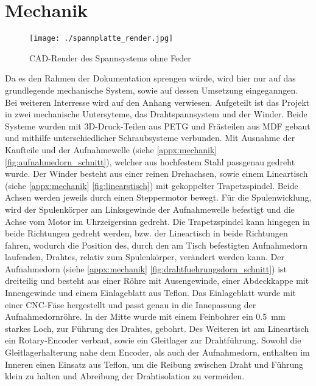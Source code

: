 \section{Mechanik}
\label{sec:Mechanik}




\begin{wrapfigure}{L}{0.3\textwidth}
    \centering
    \texttt{[image: ./spannplatte\_render.jpg]}
    \caption{CAD-Render des Spannsystems ohne Feder}
\end{wrapfigure}
Da es den Rahmen der Dokumentation sprengen würde, wird hier nur auf das grundlegende mechanische System, sowie auf dessen Umsetzung eingeganngen. Bei weiteren Interresse wird auf den Anhang verwiesen. Aufgeteilt ist das Projekt in zwei mechanische Untersyteme, das Drahtspannsystem und der Winder.\newline
Beide Systeme wurden mit 3D-Druck-Teilen aus PETG und Frästeilen aus MDF gebaut und mithilfe unterschiedlicher Schraubsysteme verbunden. Mit Ausnahme der Kaufteile und der Aufnahmewelle (siehe \autoref{appx:mechanik} \autoref{fig:aufnahmedorn_schnitt}), welcher aus hochfestem Stahl passgenau gedreht wurde.
\newline
Der Winder besteht aus einer reinen Drehachsen, sowie einem Lineartisch (siehe \autoref{appx:mechanik} \autoref{fig:linearstisch}) mit gekoppelter Trapetzspindel. Beide Achsen werden jeweils durch einen Steppermotor bewegt. Für die Spulenwicklung, wird der Spulenkörper am Linksgewinde der Aufnahmewelle befestigt und die Achse vom Motor im Uhrzeigersinn gedreht. Die Trapetzspindel kann hingegen in beide Richtungen gedreht werden, bzw. der Lineartisch in beide Richtungen fahren, wodurch die Position des, durch den am Tisch befestigten Aufnahmedorn laufenden, Drahtes, relativ zum Spulenkörper, verändert werden kann. Der Aufnahmedorn (siehe \autoref{appx:mechanik} \autoref{fig:drahtfuehrungsdorn_schnitt}) ist dreiteilig und besteht aus einer Röhre mit Ausengewinde, einer Abdeckkappe mit Innengewinde und einem Einlageblatt aus Teflon. Das Einlageblatt wurde mit einer CNC-Fäse hergestellt und passt genau in die Innepassung der Aufnahmedornröhre. In der Mitte wurde mit einem Feinbohrer ein 0.5~\si{\milli\metre} starkes Loch, zur Führung des Drahtes, gebohrt.
Des Weiteren ist am Lineartisch ein Rotary-Encoder verbaut, sowie ein Gleitlager zur Drahtführung. Sowohl die Gleitlagerhalterung nahe dem Encoder, als auch der Aufnahmedorn, enthalten im Inneren einen Einsatz aus Teflon, um die Reibung zwischen Draht und Führung klein zu halten und Abreibung der Drahtisolation zu vermeiden.\newline


